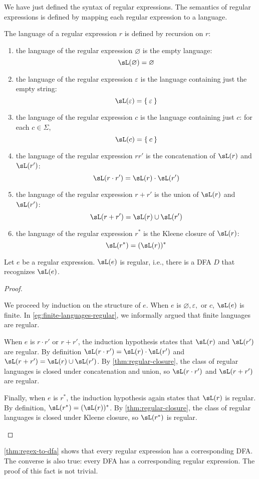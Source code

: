 \documentclass{zett}
\begin{document}
\begin{node}
  We have just defined the syntax of regular expressions.
  The semantics of regular expressions is defined by mapping each regular expression to a language.
\end{node}

\begin{defn}
  The language of a regular expression $r$ is defined by recursion on $r$:
  \begin{enumerate}
  \item the language of the regular expression $\varnothing$ is the empty language:
    $$\sL(\varnothing) = \varnothing$$
  \item the language of the regular expression $\varepsilon$ is the language containing just the empty string:
    $$\sL(\varepsilon) = \Set{\varepsilon}$$
  \item the language of the regular expression $c$ is the language containing just $c$: for each $c \in \Sigma$,
    $$\sL(c) = \Set{c}$$
  \item the language of the regular expression $rr'$ is the concatenation of $\sL(r)$ and $\sL(r')$:
    $$\sL(r \cdot r') = \sL(r) \cdot \sL(r')$$
  \item the language of the regular expression $r + r'$ is the union of $\sL(r)$ and $\sL(r')$:
    $$\sL(r + r') = \sL(r) \cup \sL(r')$$
  \item the language of the regular expression $r^{*}$ is the Kleene closure of $\sL(r)$:
    $$\sL(r^{*}) = (\sL(r))^{*}$$
  \end{enumerate}
\end{defn}

\begin{thm}\label{thm:regex-to-dfa}
  Let $e$ be a regular expression.
  $\sL(e)$ is regular, i.e., there is a DFA $D$ that recognizes $\sL(e)$.
\end{thm}
\begin{proof}
  \begin{node}
    We proceed by induction on the structure of $e$.
    When $e$ is $\varnothing, \varepsilon,$ or $c$, $\sL(e)$ is finite.
    In \cref{eg:finite-languages-regular}, we informally argued that finite languages are regular.
  \end{node}
  \begin{node}
    When $e$ is $r \cdot r'$ or $r + r'$, the induction hypothesis states that $\sL(r)$ and $\sL(r')$ are regular.
    By definition $\sL(r \cdot r') = \sL(r) \cdot \sL(r')$ and $\sL(r + r') = \sL(r) \cup \sL(r')$.
    By \cref{thm:regular-closure}, the class of regular languages is closed under concatenation and union, so $\sL(r \cdot r')$ and $\sL(r + r')$ are regular.
  \end{node}
  \begin{node}
    Finally, when $e$ is $r^{*}$, the induction hypothesis again states that $\sL(r)$ is regular.
    By definition, $\sL(r^{*}) = (\sL(r))^{*}$.
    By \cref{thm:regular-closure}, the class of regular languages is closed under Kleene closure, so $\sL(r^{*})$ is regular.
  \end{node}
\end{proof}

\begin{node}
  \cref{thm:regex-to-dfa} shows that every regular expression has a corresponding DFA.
  The converse is also true: every DFA has a corresponding regular expression.
  The proof of this fact is not trivial.
\end{node}
\end{document}
